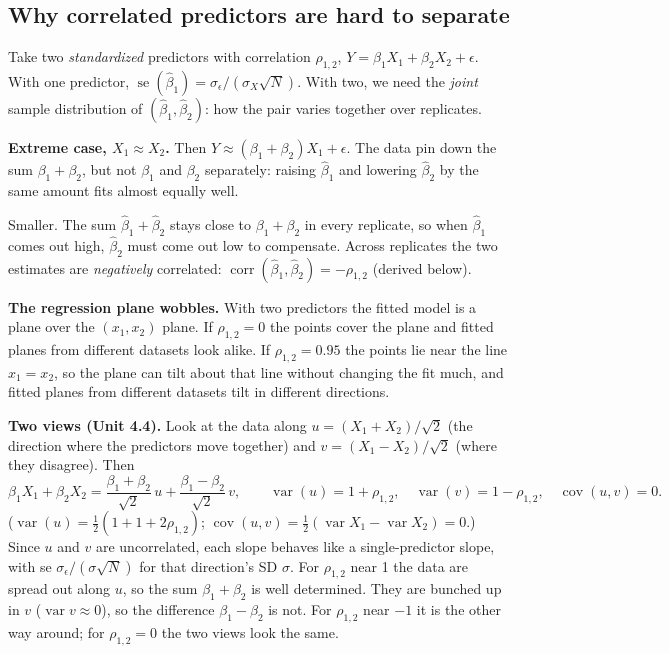 \documentclass[11pt]{article}
\newcommand{\Var}{\operatorname{var}}
\newcommand{\Cov}{\operatorname{cov}}
\newcommand{\corr}{\operatorname{corr}}
\newcommand{\se}{\operatorname{se}}
\begin{document}
\subsection{Why correlated predictors are hard to separate}
Take two \emph{standardized} predictors with correlation $\rho_{1,2}$, $Y=\beta_1X_1+\beta_2X_2+\epsilon$. With one predictor,
$\se(\hat\beta_1)=\sigma_\epsilon/(\sigma_X\sqrt N)$. With two, we need the \emph{joint} sample distribution of $(\hat\beta_1,\hat\beta_2)$: how the pair
varies together over replicates.

\textbf{Extreme case, $X_1\approx X_2$.} Then $Y\approx(\beta_1+\beta_2)X_1+\epsilon$. The data pin down the sum $\beta_1+\beta_2$, but not $\beta_1$ and
$\beta_2$ separately: raising $\hat\beta_1$ and lowering $\hat\beta_2$ by the same amount fits almost equally well.

\begin{examplebox}[title={Question (10/21): a new dataset gives a larger $\hat\beta_1$. What do you expect for $\hat\beta_2$?}]
Smaller. The sum $\hat\beta_1+\hat\beta_2$ stays close to $\beta_1+\beta_2$ in every replicate, so when $\hat\beta_1$ comes out high, $\hat\beta_2$ must come out
low to compensate. Across replicates the two estimates are \emph{negatively} correlated: $\corr(\hat\beta_1,\hat\beta_2)=-\rho_{1,2}$ (derived below).
\end{examplebox}

\textbf{The regression plane wobbles.} With two predictors the fitted model is a plane over the $(x_1,x_2)$ plane. If $\rho_{1,2}=0$ the points
cover the plane and fitted planes from different datasets look alike. If $\rho_{1,2}=0.95$ the points lie near the line $x_1=x_2$, so the plane can
tilt about that line without changing the fit much, and fitted planes from different datasets tilt in different directions.

\textbf{Two views (Unit 4.4).} Look at the data along $u=(X_1+X_2)/\sqrt2$ (the direction where the predictors move together) and
$v=(X_1-X_2)/\sqrt2$ (where they disagree). Then
\[
\beta_1X_1+\beta_2X_2=\frac{\beta_1+\beta_2}{\sqrt2}\,u+\frac{\beta_1-\beta_2}{\sqrt2}\,v,\qquad
\Var(u)=1+\rho_{1,2},\quad\Var(v)=1-\rho_{1,2},\quad\Cov(u,v)=0.
\]
($\Var(u)=\frac12(1+1+2\rho_{1,2})$; $\Cov(u,v)=\frac12(\Var X_1-\Var X_2)=0$.) Since $u$ and $v$ are uncorrelated, each slope behaves like a
single-predictor slope, with se $\sigma_\epsilon/(\sigma\sqrt N)$ for that direction's SD $\sigma$. For $\rho_{1,2}$ near 1 the data are spread out along $u$, so the sum
$\beta_1+\beta_2$ is well determined. They are bunched up in $v$ ($\Var v\approx0$), so the difference $\beta_1-\beta_2$ is not. For $\rho_{1,2}$ near $-1$
it is the other way around; for $\rho_{1,2}=0$ the two views look the same.
\end{document}
